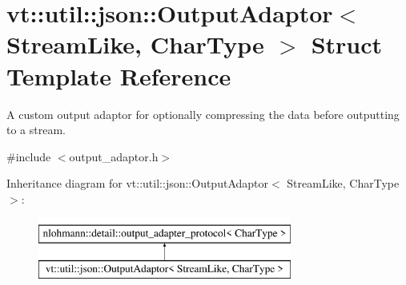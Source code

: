 \hypertarget{structvt_1_1util_1_1json_1_1_output_adaptor}{}\section{vt\+:\+:util\+:\+:json\+:\+:Output\+Adaptor$<$ Stream\+Like, Char\+Type $>$ Struct Template Reference}
\label{structvt_1_1util_1_1json_1_1_output_adaptor}


A custom output adaptor for optionally compressing the data before outputting to a stream.  




{\ttfamily \#include $<$output\+\_\+adaptor.\+h$>$}

Inheritance diagram for vt\+:\+:util\+:\+:json\+:\+:Output\+Adaptor$<$ Stream\+Like, Char\+Type $>$\+:\begin{figure}[H]
\begin{center}
\leavevmode
\includegraphics[height=2.000000cm]{structvt_1_1util_1_1json_1_1_output_adaptor}
\end{center}
\end{figure}
